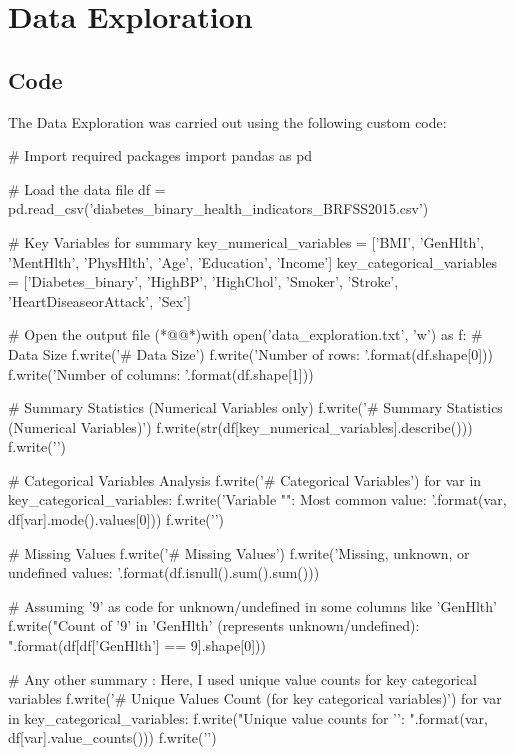 \documentclass[11pt]{article}
\begin{document}
\section{Data Exploration}
\subsection{{Code}}
The Data Exploration was carried out using the following custom code:

\begin{python}

# Import required packages
import pandas as pd

# Load the data file
df = pd.read_csv('diabetes_binary_health_indicators_BRFSS2015.csv')

# Key Variables for summary
key_numerical_variables = ['BMI', 'GenHlth', 'MentHlth', 'PhysHlth', 'Age', 'Education', 'Income']
key_categorical_variables = ['Diabetes_binary', 'HighBP', 'HighChol', 'Smoker', 'Stroke', 'HeartDiseaseorAttack', 'Sex']

# Open the output file
(*@@*)with open('data_exploration.txt', 'w') as f:
    # Data Size
    f.write('# Data Size\n')
    f.write('Number of rows: {}\n'.format(df.shape[0]))
    f.write('Number of columns: {}\n\n'.format(df.shape[1]))

    # Summary Statistics (Numerical Variables only)
    f.write('# Summary Statistics (Numerical Variables)\n')
    f.write(str(df[key_numerical_variables].describe()))
    f.write('\n\n')

    # Categorical Variables Analysis
    f.write('# Categorical Variables\n')
    for var in key_categorical_variables:
        f.write('Variable "{}": Most common value: {}\n'.format(var, df[var].mode().values[0]))
    f.write('\n')

    # Missing Values
    f.write('# Missing Values\n')
    f.write('Missing, unknown, or undefined values: {}\n'.format(df.isnull().sum().sum()))
    
    # Assuming '9' as code for unknown/undefined in some columns like 'GenHlth'
    f.write("Count of '9' in 'GenHlth' (represents unknown/undefined): {}\n\n".format(df[df['GenHlth'] == 9].shape[0]))

    # Any other summary : Here, I used unique value counts for key categorical variables
    f.write('# Unique Values Count (for key categorical variables)\n')
    for var in key_categorical_variables:
        f.write("Unique value counts for '{}': \n{}\n".format(var, df[var].value_counts()))
    f.write('\n')

\end{python}
\end{document}
